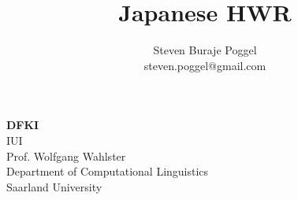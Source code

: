 
\title{Japanese HWR}
\author{Steven Buraje Poggel\\
steven.poggel@gmail.com}

%

\maketitle

\begin{center}
\textbf{DFKI} \\
IUI \\
Prof. Wolfgang Wahlster \\
Department of Computational Linguistics\\
Saarland University
\end{center}

\thispagestyle{empty}
\newpage
\textsc{ }
\thispagestyle{empty}
\newpage


%
\thispagestyle{empty}
\tableofcontents

\newpage

\textsc{ }
%
%
\thispagestyle{empty}

\newpage

%

\fontsize{11pt}{13}\selectfont
